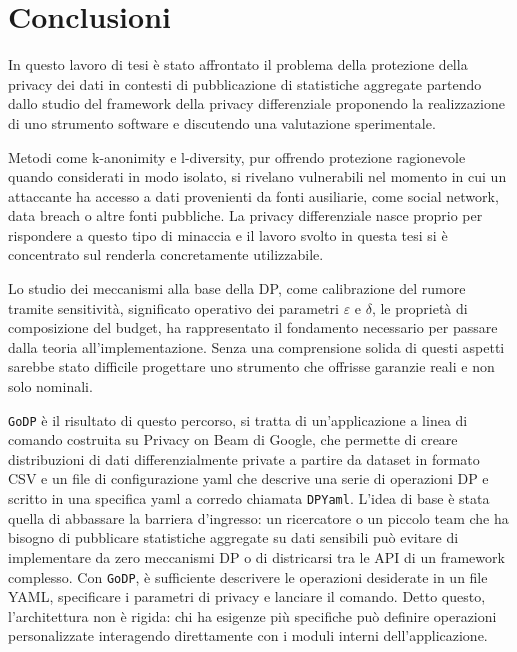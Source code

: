 \chapter*{Conclusioni}

In questo lavoro di tesi è stato affrontato il problema della protezione della privacy dei dati in contesti di pubblicazione di statistiche aggregate partendo dallo studio del framework della privacy differenziale proponendo la realizzazione di uno strumento software e discutendo una valutazione sperimentale.

Metodi come k-anonimity e l-diversity, pur offrendo protezione ragionevole quando considerati in modo isolato, si rivelano vulnerabili nel momento in cui un attaccante ha accesso a dati provenienti da fonti ausiliarie, come social network, data breach o altre fonti pubbliche. La privacy differenziale nasce proprio per rispondere a questo tipo di minaccia e il lavoro svolto in questa tesi si è concentrato sul renderla concretamente utilizzabile.

Lo studio dei meccanismi alla base della DP, come calibrazione del rumore tramite sensitività, significato operativo dei parametri $\varepsilon$ e $\delta$, le proprietà di composizione del budget, ha rappresentato il fondamento necessario per passare dalla teoria all'implementazione. Senza una comprensione solida di questi aspetti sarebbe stato difficile progettare uno strumento che offrisse garanzie reali e non solo nominali.

\texttt{GoDP} è il risultato di questo percorso, si tratta di un'applicazione a linea di comando costruita su Privacy on Beam di Google, che permette di creare distribuzioni di dati differenzialmente private a partire da dataset in formato CSV e un file di configurazione yaml che descrive una serie di operazioni DP e scritto in una specifica yaml a corredo chiamata \texttt{DPYaml}. L'idea di base è stata quella di abbassare la barriera d'ingresso: un ricercatore o un piccolo team che ha bisogno di pubblicare statistiche aggregate su dati sensibili può evitare di implementare da zero meccanismi DP o di districarsi tra le API di un framework complesso. Con \texttt{GoDP}, è sufficiente descrivere le operazioni desiderate in un file YAML, specificare i parametri di privacy e lanciare il comando. Detto questo, l'architettura non è rigida: chi ha esigenze più specifiche può definire operazioni personalizzate interagendo direttamente con i moduli interni dell'applicazione.

